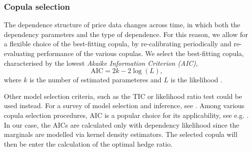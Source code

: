 
\subsubsection{Copula selection}\label{subsec:copula-selection}
The dependence structure of price data changes across time, in which
both the dependency parameters and the type of dependence.
For this reason, we allow for a flexible choice of the best-fitting copula, by re-calibrating periodically and re-evaluating performance of the various copulas.
We select the best-fitting copula, characterised by the lowest {\em Akaike Information Criterion (AIC)},
\begin{equation*}
 \text{AIC} = 2k- 2 \log(L),
\end{equation*}
where $k$ is the number of estimated
parameteres and $L$ is the likelihood \citep{Akaike1973}. 

Other model selection criteria, such as the TIC\citep{Takeuchi1976} or likelihood ratio test could be used instead.
For a survey of model selection and inference, see \cite{anderson1998comparison}.
Among various copula selection procedures, AIC is a popular choice for
its applicability, see e.g. \cite{breymann2003dependence}.
In our case, the AICs are calculated only with dependency likelihood
since the marginals are modelled via kernel density estimators.
The selected copula will then be enter the calculation of the optimal
hedge ratio.


